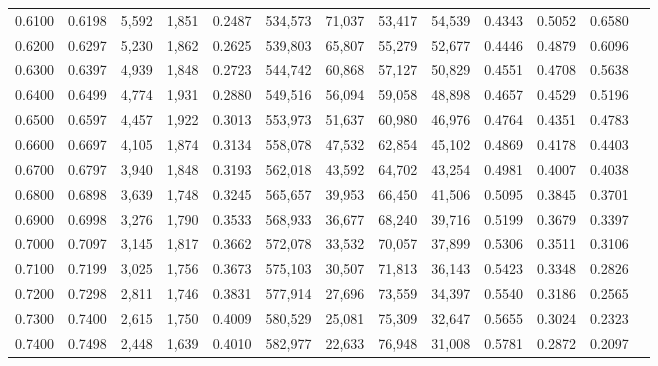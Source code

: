 \begin{tabular}{rrrrrrrrrrrrr}
0.6100 & 0.6198 &  5,592 & 1,851 &                                     0.2487 & 534,573 &  71,037 &  53,417 &  54,539 & 0.4343 & 0.5052 & 0.6580 \\
0.6200 & 0.6297 &  5,230 & 1,862 &                                     0.2625 & 539,803 &  65,807 &  55,279 &  52,677 & 0.4446 & 0.4879 & 0.6096 \\
0.6300 & 0.6397 &  4,939 & 1,848 &                                     0.2723 & 544,742 &  60,868 &  57,127 &  50,829 & 0.4551 & 0.4708 & 0.5638 \\
0.6400 & 0.6499 &  4,774 & 1,931 &                                     0.2880 & 549,516 &  56,094 &  59,058 &  48,898 & 0.4657 & 0.4529 & 0.5196 \\
0.6500 & 0.6597 &  4,457 & 1,922 &                                     0.3013 & 553,973 &  51,637 &  60,980 &  46,976 & 0.4764 & 0.4351 & 0.4783 \\
0.6600 & 0.6697 &  4,105 & 1,874 &                                     0.3134 & 558,078 &  47,532 &  62,854 &  45,102 & 0.4869 & 0.4178 & 0.4403 \\
0.6700 & 0.6797 &  3,940 & 1,848 &                                     0.3193 & 562,018 &  43,592 &  64,702 &  43,254 & 0.4981 & 0.4007 & 0.4038 \\
0.6800 & 0.6898 &  3,639 & 1,748 &                                     0.3245 & 565,657 &  39,953 &  66,450 &  41,506 & 0.5095 & 0.3845 & 0.3701 \\
0.6900 & 0.6998 &  3,276 & 1,790 &                                     0.3533 & 568,933 &  36,677 &  68,240 &  39,716 & 0.5199 & 0.3679 & 0.3397 \\
0.7000 & 0.7097 &  3,145 & 1,817 &                                     0.3662 & 572,078 &  33,532 &  70,057 &  37,899 & 0.5306 & 0.3511 & 0.3106 \\
0.7100 & 0.7199 &  3,025 & 1,756 &                                     0.3673 & 575,103 &  30,507 &  71,813 &  36,143 & 0.5423 & 0.3348 & 0.2826 \\
0.7200 & 0.7298 &  2,811 & 1,746 &                                     0.3831 & 577,914 &  27,696 &  73,559 &  34,397 & 0.5540 & 0.3186 & 0.2565 \\
0.7300 & 0.7400 &  2,615 & 1,750 &                                     0.4009 & 580,529 &  25,081 &  75,309 &  32,647 & 0.5655 & 0.3024 & 0.2323 \\
0.7400 & 0.7498 &  2,448 & 1,639 &                                     0.4010 & 582,977 &  22,633 &  76,948 &  31,008 & 0.5781 & 0.2872 & 0.2097 \\

\end{tabular}
